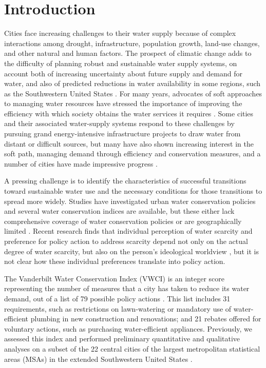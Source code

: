 \documentclass[draft,linenumbers]{agujournal}\usepackage{knitr}
\begin{document}
\section{Introduction}
Cities face increasing challenges to their water supply because of complex interactions among drought, infrastructure, population growth, land-use changes, and other natural and human factors.
The prospect of climatic change adds to the difficulty of planning robust and sustainable water supply systems, on account both of  increasing uncertainty about future supply and demand for water, and also of predicted reductions in water availability in some regions, such as the Southwestern United States \citep{gcrp_natl_assessment_3_2014}.
For many years, advocates of soft approaches to managing water resources have stressed the importance of improving the efficiency with which society obtains the water services it requires \citep{gleick_soft_water_paths_2002}.
Some cities and their associated water-supply systems respond to these challenges by pursuing grand energy-intensive infrastructure projects to draw water from distant or difficult sources, but many have also shown increasing interest in the soft path, managing demand through efficiency and conservation measures, and a number of cities have made impressive progress \citep{fleck_fighting_2016}.

A pressing challenge is to identify the characteristics of successful transitions toward sustainable water use and the necessary conditions for those transitions to spread more widely.
Studies have investigated urban water conservation policies and several water conservation indices are available, but these either lack comprehensive coverage of water conservation policies or are geographically limited \citep{hess_vwci_2017,sauri_conservation_2013,maggioni_conservation_2014}.
Recent research finds that individual perception of water scarcity and preference for policy action to address scarcity depend not only on the actual degree of water scarcity, but also on the person's ideological worldview \citep{switzer_green_lenses_2016}, but it is not clear how these individual preferences translate into policy action.

The Vanderbilt Water Conservation Index (VWCI) is an integer score representing the number of measures that a city has taken to reduce its water demand, out of a list of 79 possible policy actions \citep{hornberger_water_conservation_2015, hess_drought_2016, hess_vwci_2017}.
This list includes 31 requirements, such as restrictions on lawn-watering or mandatory use of water-efficient plumbing in new construction and renovations; and 21 rebates offered for voluntary actions, such as purchasing water-efficient appliances.
Previously, we assessed this index and performed preliminary quantitative and qualitative analyses on a subset of the 22 central cities of the largest metropolitan statistical areas (MSAs) in the extended Southwestern United States \citep{hess_drought_2016}.
\end{document}
